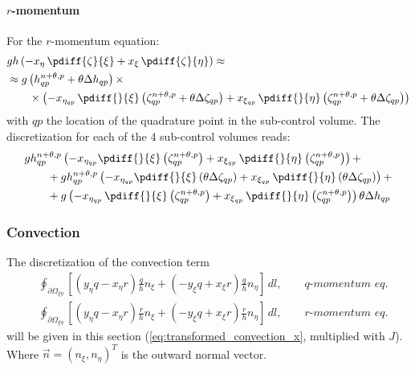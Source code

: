 \paragraph*{$r$-momentum}
For the $r$-momentum equation:
\begin{align}
    & g h \left( -x_{\eta}\, \pdiff{\zeta}{\xi} + x_{\xi}\, \pdiff{\zeta}{\eta} \right) \approx
    \\
    & \approx g \left( h^{n+\theta,p}_{qp} + \theta \Delta h_{qp}\right)  \times
    \\*
    & \qquad \times \left( -x_{\eta_{qp}}\, \pdiff{}{\xi}\left(\zeta^{n+\theta,p}_{qp} + \theta \Delta \zeta_{qp} \right)
    + x_{\xi_{qp}}\, \pdiff{}{\eta}\left(\zeta^{n+\theta,p}_{qp} + \theta \Delta \zeta_{qp}   \right)
    \right)
\end{align}
with $qp$ the location of the quadrature point in the sub-control volume.
The discretization for each of the 4 sub-control volumes reads:
%
\begin{align}
    &g h^{n+\theta,p}_{qp} \left( -x_{\eta_{qp}}\pdiff{}{\xi}\left( \zeta^{n+\theta,p}_{qp} \right)
    +x_{\xi_{qp}}\, \pdiff{}{\eta}\left(\zeta^{n+\theta,p}_{qp} \right) \right) +
    \\
    &\qquad + g h^{n+\theta,p}_{qp} \left( -x_{\eta_{qp}}\pdiff{}{\xi}\left(\theta\Delta \zeta_{qp}\right)
    + x_{\xi_{qp}}\, \pdiff{}{\eta} \left(\theta\Delta\zeta_{qp} \right)
    \right) +
    \\
    &\qquad + g
    \left(- x_{\eta_{qp}}\, \pdiff{}{\xi}\left(\zeta^{n+\theta,p}_{qp} \right)
    +x_{\xi_{qp}}\, \pdiff{}{\eta}\left(\zeta^{n+\theta,p}_{qp} \right)
    \right)\theta \Delta h_{qp}
\end{align}
\subsubsection{Convection}
The discretization of the convection term
\begin{align}
    &\oint_{\partial\Omega_{\xi\eta}} \left[  \left( y_{\eta}q - x_{\eta} r \right) \frac{q}{h}  n_\xi + \left( -y_{\xi}q  + x_{\xi}r\right) \frac{q}{h} n_\eta \right] \, dl,\qquad \textit{$q$-momentum eq.}
    \\
    &\oint_{\partial\Omega_{\xi\eta}} \left[  \left( y_{\eta}q - x_{\eta} r \right) \frac{r}{h}  n_\xi + \left( -y_{\xi}q  + x_{\xi}r\right) \frac{r}{h} n_\eta \right] \, dl,\qquad \textit{$r$-momentum eq.}
\end{align}
will be given in this section (\autoref{eq:transformed_convection_x}, multiplied with $J$).
Where $\vec{n} = (n_\xi, n_\eta)^T$ is the outward normal vector.

